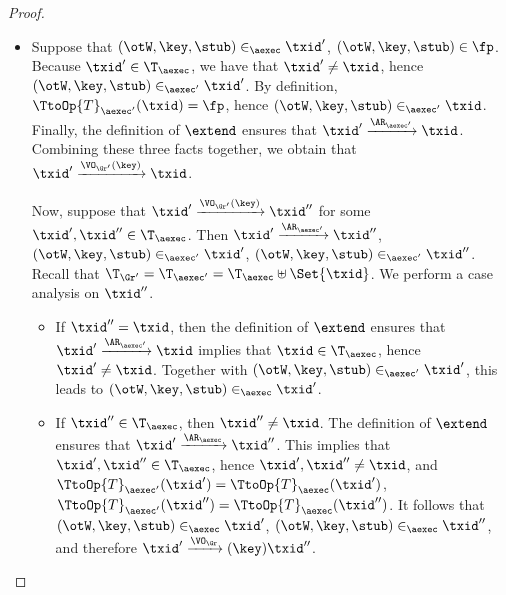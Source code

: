 \begin{proof}
\begin{enumerate}
\begin{itemize}
\item Suppose that $(\otW, \key, \stub) \in_{\aexec} \txid'$, $(\otW, \key, \stub) \in \fp$. Because $\txid' \in \T_{\aexec}$, 
we have that $\txid' \neq \txid$, hence $(\otW, \key, \stub) \in_{\aexec' }\txid'$. By definition, 
$\TtoOp{T}_{\aexec'}(\txid) = \fp$, hence $(\otW, \key, \stub) \in_{\aexec'} \txid$. Finally, 
the definition of $\extend$ ensures that $\txid' \xrightarrow{\AR_{\aexec'}} \txid$. Combining 
these three facts together, we obtain that  
$\txid' \xrightarrow{\VO_{\Gr'}(\key)} \txid$. 

Now, suppose that $\txid' \xrightarrow{\VO_{\Gr'}(\key)} \txid''$ for some $\txid', \txid'' \in \T_{\aexec}$. 
Then $\txid' \xrightarrow{\AR_{\aexec'}} \txid''$, $(\otW, \key, \stub) \in_{\aexec'} \txid'$, $(\otW, \key, \stub) 
\in_{\aexec'} \txid''$. 
Recall that $\T_{\Gr'} = \T_{\aexec'} = \T_{\aexec} \uplus \Set{ \txid }$. We perform a case analysis on $\txid''$. 

\begin{itemize}

\item If $\txid'' = \txid$, then the definition of $\extend$ ensures that $\txid' \xrightarrow{\AR_{\aexec'}} \txid$ 
implies that $\txid \in \T_{\aexec}$, hence $\txid' \neq \txid$. 
Together with $(\otW, \key, \stub) \in_{\aexec'} 
\txid'$, this leads to $(\otW, \key, \stub) \in_{\aexec} \txid'$. 

\item If $\txid'' \in \T_{\aexec}$, then $\txid'' \neq \txid$. The definition of $\extend$ ensures that $\txid' \xrightarrow{\AR_{\aexec}} \txid''$. 
This implies that $\txid', \txid'' \in \T_{\aexec}$, hence $\txid', \txid'' \neq \txid$, and $\TtoOp{T}_{\aexec'}(\txid') = \TtoOp{T}_{\aexec}(\txid')$, 
$\TtoOp{T}_{\aexec'}(\txid'') = \TtoOp{T}_{\aexec}(\txid'')$. It follows that $(\otW, \key, \stub) \in_{\aexec} \txid'$, 
$(\otW, \key, \stub) \in_{\aexec} \txid''$, and therefore $\txid' \xrightarrow{\VO_{\Gr}}(\key) \txid''$.

\end{itemize}
\end{itemize}
\end{enumerate}
\end{proof}


